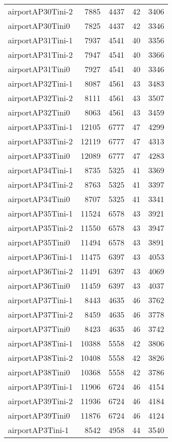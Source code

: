 \begin{longtable}{lrrrr}
airportAP30Tini-2 & 7885 & 4437 & 42 & 3406 \\
airportAP30Tini0 & 7825 & 4437 & 42 & 3346 \\
airportAP31Tini-1 & 7937 & 4541 & 40 & 3356 \\
airportAP31Tini-2 & 7947 & 4541 & 40 & 3366 \\
airportAP31Tini0 & 7927 & 4541 & 40 & 3346 \\
airportAP32Tini-1 & 8087 & 4561 & 43 & 3483 \\
airportAP32Tini-2 & 8111 & 4561 & 43 & 3507 \\
airportAP32Tini0 & 8063 & 4561 & 43 & 3459 \\
airportAP33Tini-1 & 12105 & 6777 & 47 & 4299 \\
airportAP33Tini-2 & 12119 & 6777 & 47 & 4313 \\
airportAP33Tini0 & 12089 & 6777 & 47 & 4283 \\
airportAP34Tini-1 & 8735 & 5325 & 41 & 3369 \\
airportAP34Tini-2 & 8763 & 5325 & 41 & 3397 \\
airportAP34Tini0 & 8707 & 5325 & 41 & 3341 \\
airportAP35Tini-1 & 11524 & 6578 & 43 & 3921 \\
airportAP35Tini-2 & 11550 & 6578 & 43 & 3947 \\
airportAP35Tini0 & 11494 & 6578 & 43 & 3891 \\
airportAP36Tini-1 & 11475 & 6397 & 43 & 4053 \\
airportAP36Tini-2 & 11491 & 6397 & 43 & 4069 \\
airportAP36Tini0 & 11459 & 6397 & 43 & 4037 \\
airportAP37Tini-1 & 8443 & 4635 & 46 & 3762 \\
airportAP37Tini-2 & 8459 & 4635 & 46 & 3778 \\
airportAP37Tini0 & 8423 & 4635 & 46 & 3742 \\
airportAP38Tini-1 & 10388 & 5558 & 42 & 3806 \\
airportAP38Tini-2 & 10408 & 5558 & 42 & 3826 \\
airportAP38Tini0 & 10368 & 5558 & 42 & 3786 \\
airportAP39Tini-1 & 11906 & 6724 & 46 & 4154 \\
airportAP39Tini-2 & 11936 & 6724 & 46 & 4184 \\
airportAP39Tini0 & 11876 & 6724 & 46 & 4124 \\
airportAP3Tini-1 & 8542 & 4958 & 44 & 3540 \\

\end{longtable}
